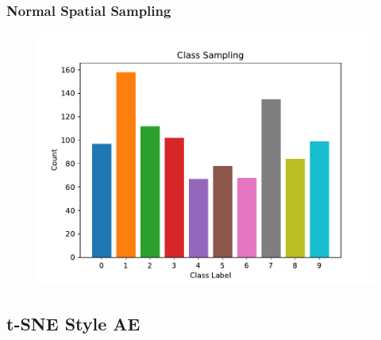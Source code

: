 \documentclass[10pt, usenames, dvipsnames, table]{beamer}
\begin{document}
\begin{frame}
  \frametitle{Normal Spatial Sampling}
  \begin{figure}
    \centering
    \includegraphics[width=\linewidth]
    {models/mnist_vae_e300_L2_b64/multi-normal_sampling_distribution_1000}
    \caption{}
    \label{}
  \end{figure}
\end{frame}

\subsection{t-SNE Style AE}

\end{document}
